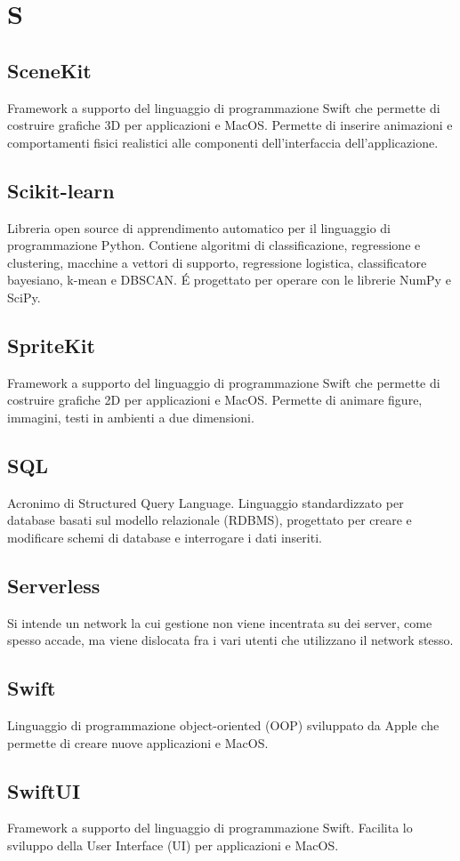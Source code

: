 \section*{S}
\markright{}
\subsection*{SceneKit}
Framework a supporto del linguaggio di programmazione Swift che permette di costruire grafiche 3D per applicazioni  e MacOS. Permette di inserire animazioni e comportamenti fisici realistici alle componenti dell'interfaccia dell'applicazione. 
\subsection*{Scikit-learn}
Libreria open source di apprendimento automatico per il linguaggio di programmazione Python. Contiene algoritmi di classificazione, regressione e clustering, macchine a vettori di supporto, regressione logistica, classificatore bayesiano, k-mean e DBSCAN. \'E progettato per operare con le librerie NumPy e SciPy. 
\subsection*{SpriteKit}
Framework a supporto del linguaggio di programmazione Swift che permette di costruire grafiche 2D per applicazioni  e MacOS. Permette di animare figure, immagini, testi in ambienti a due dimensioni.
\subsection*{SQL}
Acronimo di Structured Query Language. Linguaggio standardizzato per database basati sul modello relazionale (RDBMS), progettato per creare e modificare schemi di database e interrogare i dati inseriti.
\subsection*{Serverless}
Si intende un network la cui gestione non viene incentrata su dei server, come spesso accade, ma viene dislocata fra i vari utenti che utilizzano il network stesso.
\subsection*{Swift}
Linguaggio di programmazione object-oriented (OOP) sviluppato da Apple che permette di creare nuove applicazioni  e MacOS.  
\subsection*{SwiftUI}
Framework a supporto del linguaggio di programmazione Swift. Facilita lo sviluppo della User Interface (UI) per applicazioni  e MacOS.